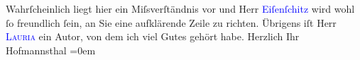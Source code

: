            \pstart
           Wahrſcheinlich liegt hier ein Miſsverſtändnis vor und Herr \textcolor{blue}{Eiſenſchitz}{}\ledrightnote{\textcolor{blue}{Otto Eisenschitz}} wird wohl ſo freundlich ſein, an Sie
                    eine aufklärende Zeile zu richten. Übrigens iſt Herr \textcolor{blue}{\textsc{Lauria}}{}\ledrightnote{\textcolor{blue}{Amilcare Lauria}} ein {\pb}Autor, von
                    dem ich viel Gutes gehört habe.\pend
           \pstart
           Herzlich Ihr{\\[\baselineskip]}\spacefill\mbox{Hofmannsthal}\pend
           \leftskip=0em{}\endnumbering{}  
      